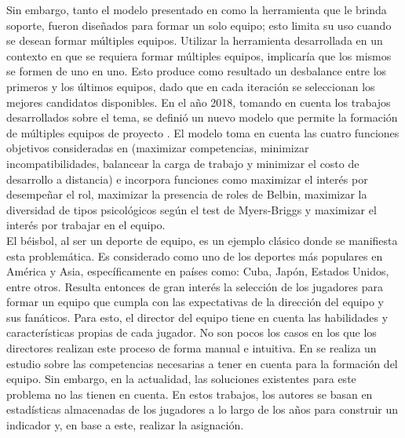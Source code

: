 Sin embargo, tanto el modelo presentado en \cite{Mayi09} como la herramienta que le brinda soporte, fueron diseñados para formar un solo equipo; esto limita su uso cuando se desean formar múltiples equipos. Utilizar la herramienta  desarrollada en un contexto en que se requiera formar múltiples equipos, implicaría que los mismos se formen de uno en uno. Esto produce como resultado un desbalance entre los primeros y los últimos equipos, dado que en cada iteración se seleccionan los mejores candidatos disponibles. En el año 2018, tomando en cuenta los trabajos desarrollados sobre el tema, se definió un nuevo modelo que permite la formación de múltiples equipos de proyecto \cite{Duran2019}. El modelo toma en cuenta las cuatro funciones objetivos consideradas en \cite{Mayi09} (maximizar competencias, minimizar incompatibilidades, balancear la carga de trabajo y minimizar el costo de desarrollo a distancia) e incorpora funciones como maximizar el interés por desempeñar el rol, maximizar la presencia de roles de Belbin, maximizar la diversidad de tipos psicológicos según el test de Myers-Briggs y maximizar el interés por trabajar en el equipo.\\

El béisbol, al ser un deporte de equipo, es un ejemplo clásico donde se manifiesta esta problemática. Es considerado como uno de los deportes más populares en América y Asia, específicamente en países como: Cuba, Japón, Estados Unidos, entre otros. Resulta entonces de gran interés la selección de los jugadores para formar un equipo que cumpla con las expectativas de la dirección del equipo y sus fanáticos. Para esto, el director del equipo tiene en cuenta las habilidades y características propias de cada jugador. No son pocos los casos en los que los directores realizan este proceso de forma manual e intuitiva. En \cite{Smith1995} se realiza un estudio sobre las competencias necesarias a tener en cuenta para la formación del equipo. Sin embargo, en la actualidad, las soluciones existentes para este problema \cite{Polyashuk2015, Sugrue2007} no las tienen en cuenta. En estos trabajos, los autores se basan en estadísticas almacenadas de los jugadores a lo largo de los años para construir un indicador y, en base a este, realizar la asignación. \\

